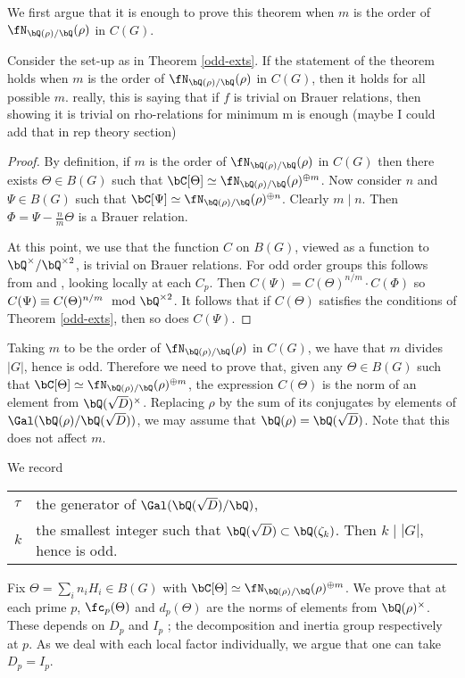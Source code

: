 We first argue that it is enough to prove this theorem when $m$ is the order of $\repnorm{\rho}$ in $C(G)$. 

\begin{lemma}
    Consider the set-up as in Theorem \ref{odd-exts}. If the statement of the theorem holds when $m$ is the order of $\repnorm{\rho}$ in $C(G)$, then it holds for all possible $m$. {\color{red} really, this is saying that if $f$ is trivial on Brauer relations, then showing it is trivial on rho-relations for minimum m is enough (maybe I could add that in rep theory section)}
\end{lemma}

\begin{proof}
    By definition, if $m$ is the order of $\repnorm{\rho}$ in $C(G)$ then there exists $\Theta \in B(G)$ such that $\bC[\Theta] \simeq \repnorm{\rho}^{\oplus m}$.
    Now consider $n$ and $\Psi \in B(G)$ such that $\bC[\Psi] \simeq \repnorm{\rho}^{\oplus n}$. Clearly $m \mid n$.  Then $\Phi = \Psi - \frac{n}{m}\Theta$ is a Brauer relation.

    At this point, we use that the function $C$ on $B(G)$, viewed as a function to $\bQ^{\times} / \bQ^{\times 2}$, is trivial on Brauer relations. For odd order groups this follows from \cite[Theorem 2.47]{reg-const} and \cite[Theorem 3.2  (Tam)]{reg-const}, looking locally at each $C_p$. 
    Then $C(\Psi) = C(\Theta)^{n / m} \cdot C(\Phi)$ so $C(\Psi) \equiv C(\Theta)^{n / m} \mod \bQ^{\times 2}$. It follows that if $C(\Theta)$ satisfies the conditions of Theorem \ref{odd-exts}, then so does $C(\Psi)$.
\end{proof}

Taking $m$ to be the order of $\repnorm{\rho}$ in $C(G)$, we have that $m$ divides $|G|$, hence is odd. Therefore we need to prove that, given any $
\Theta \in B(G)$ such that $\bC[\Theta] \simeq \repnorm{\rho}^{\oplus m}$, the expression $C(\Theta)$ is the norm of an element from $\bQ(\sqrt{D})^{\times}$.
Replacing $\rho$ by the sum of its conjugates by elements of $ \Gal(\bQ(\rho) / \bQ(\sqrt{D}))$, we may assume that $\bQ(\rho) = \bQ(\sqrt{D})$. Note that this does not affect $m$. 

We record
\begin{table}[H]
         \vspace{-1em}
         \setlength\itemsep{0em}
        \centering
\begin{tabular}{l l}
    $\tau$ & the generator of $\Gal(\bQ(\sqrt{D}) / \bQ)$, \\
    $k$ & the smallest integer such that $\bQ(\sqrt{D}) \subset \bQ(\zeta_k)$. Then $k \mid |G|$, hence is odd.
\end{tabular}
\vspace{-1em}
\end{table}
Fix $\Theta = \sum_i n_i H_i \in B(G)$ with $\bC[\Theta] \simeq \repnorm{\rho}^{\oplus m}$. We prove that at each prime $p$, $\fc_p(\Theta)$ and $d_p(\Theta)$ are the norms of elements from $\bQ(\rho)^{\times}$.  These depends on $D_p$ and $I_p$ ; the decomposition and inertia group respectively at $p$. As we deal with each local factor individually, we argue that one can take $D_p = I_p$.

